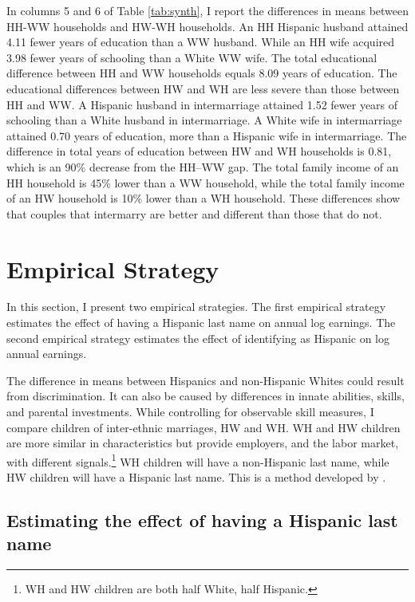 \documentclass[a4paper,fleqn]{cas-sc}
\begin{document}
In columns 5 and 6 of Table \ref{tab:synth}, I report the differences in means between HH-WW households and HW-WH households. An HH Hispanic husband attained 4.11 fewer years of education than a WW husband. While an HH wife acquired 3.98 fewer years of schooling than a White WW wife. The total educational difference between HH and WW households equals 8.09 years of education. The educational differences between HW and WH are less severe than those between HH and WW. A Hispanic husband in intermarriage attained 1.52 fewer years of schooling than a White husband in intermarriage. A White wife in intermarriage attained 0.70 years of education, more than a Hispanic wife in intermarriage. The difference in total years of education between HW and WH households is 0.81, which is an 90\% decrease from the HH--WW gap. The total family income of an HH household is 45\% lower than a WW household, while the total family income of an HW household is 10\% lower than a WH household. These differences show that couples that intermarry are better and different than those that do not.

\section{Empirical Strategy}\label{sec:emp_model}

In this section, I present two empirical strategies. The first empirical strategy estimates the effect of having a Hispanic last name on annual log earnings. The second empirical strategy estimates the effect of identifying as Hispanic on log annual earnings.

The difference in means between Hispanics and non-Hispanic Whites could result from discrimination. It can also be caused by differences in innate abilities, skills, and parental investments. While controlling for observable skill measures, I compare children of inter-ethnic marriages, HW and WH. WH and HW children are more similar in characteristics but provide employers, and the labor market, with different signals.\footnote{WH and HW children are both half White, half Hispanic.} WH children will have a non-Hispanic last name, while HW children will have a Hispanic last name. This is a method developed by \citet{rubinstein2014pride}.


\subsection{Estimating the effect of having a Hispanic last name}
\end{document}
